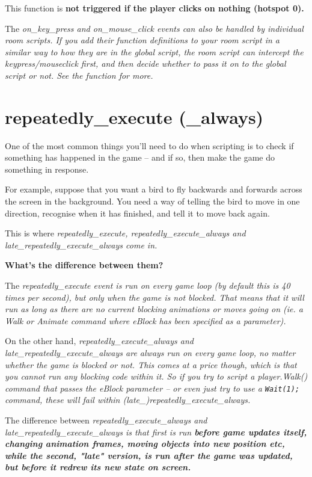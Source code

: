 \begin{description}
  This function is \bf{not} triggered if the player clicks on nothing (hotspot 0).
\end{description}

The \it{on_key_press} and \it{on_mouse_click} events can also be handled by
individual room scripts. If you add their function definitions to your room script
in a similar way to how they are in the global script, the room script can intercept
the keypress/mouseclick first, and then decide whether to pass it on to the global
script or not. See the  function for more.


\section{repeatedly_execute (_always)}\label{RepExec}%

One of the most common things you'll need to do when scripting is to check if something
has happened in the game -- and if so, then make the game do something in response.

For example, suppose that you want a bird to fly backwards and forwards across the screen
in the background. You need a way of telling the bird to move in one direction, recognise
when it has finished, and tell it to move back again.

This is where \it{repeatedly_execute}, \it{repeatedly_execute_always} and \it{late_repeatedly_execute_always} come in.

\bf{What's the difference between them?}

The \it{repeatedly_execute} event is run on every game loop (by default this is 40 times per
second), but only when the game is not blocked. That means that it will run as long as there
are no current blocking animations or moves going on (ie. a Walk or Animate command where
\it{eBlock} has been specified as a parameter).

On the other hand, \it{repeatedly_execute_always} and \it{late_repeatedly_execute_always} are always run on every game loop, no matter
whether the game is blocked or not. This comes at a price though, which is that you cannot
run any blocking code within it. So if you try to script a \it{player.Walk()} command that
passes the \it{eBlock} parameter -- or even just try to use a \verb$Wait(1);$ command, these
will fail within \it{(late_)repeatedly_execute_always}.

The difference between \it{repeatedly_execute_always} and \it{late_repeatedly_execute_always} is that first
is run \bf{before} game updates itself, changing animation frames, moving objects into new position etc, while
the second, "late" version, is run \bf{after} the game was updated, but before it redrew its new state on screen.

